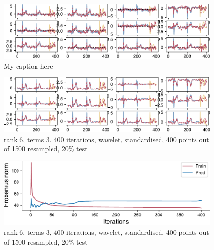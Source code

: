 \documentclass{mldsmsc}
\begin{document}
\begin{figure}[H]
\begin{center}
\includegraphics[scale=1]{images/periodic_fit_1500_6_6_150it.pdf}
\caption{My caption here}
\label{somelabelforreference}
\end{center}
\end{figure}

\begin{figure}[H]
\begin{center}
\includegraphics[scale=1]{images/forecast/periodic_fit.pdf}
\caption{rank 6, terms 3, 400 iterations, wavelet, standardised, 400 points out of 1500 resampled, 20\% test}
\label{forecast}
\end{center}
\end{figure}

\begin{figure}[H]
\begin{center}
\includegraphics[scale=1]{images/forecast/periodic_cost.pdf}
\caption{rank 6, terms 3, 400 iterations, wavelet, standardised, 400 points out of 1500 resampled, 20\% test}
\label{loss}
\end{center}
\end{figure}
\end{document}
